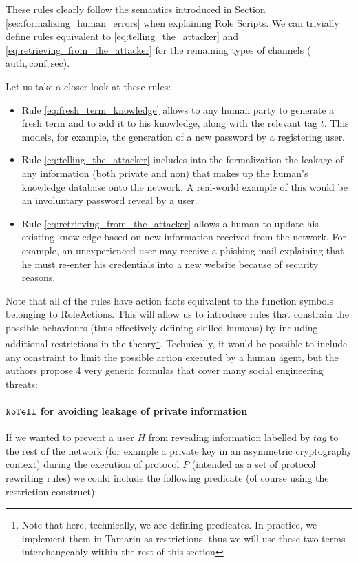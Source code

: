 \documentclass{article}
\newcommand{\mono}[1]{\textrm{\tt #1}}
\begin{document}
These rules clearly follow the semantics introduced in Section \ref{sec:formalizing_human_errors} when explaining Role Scripts. We can trivially define rules equivalent to \ref{eq:telling_the_attacker} and \ref{eq:retrieving_from_the_attacker} for the remaining types of channels ($\textrm{auth}, \textrm{conf}, \textrm{sec}$).

Let us take a closer look at these rules:

\begin{itemize}
    \item Rule \ref{eq:fresh_term_knowledge} allows to any human party to generate a fresh term and to add it to his knowledge, along with the relevant tag $t$. This models, for example, the generation of a new password by a registering user.
    \item Rule \ref{eq:telling_the_attacker} includes into the formalization the leakage of any information (both private and non) that makes up the human's knowledge database onto the network. A real-world example of this would be an involuntary password reveal by a user.
    \item Rule \ref{eq:retrieving_from_the_attacker} allows a human to update his existing knowledge based on new information received from the network. For example, an unexperienced user may receive a phishing mail explaining that he must re-enter his credentials into a new website because of security reasons.
\end{itemize}

Note that all of the rules have action facts equivalent to the function symbols belonging to $\textrm{RoleActions}$. This will allow us to introduce rules that constrain the possible behaviours (thus effectively defining skilled humans) by including additional restrictions in the theory\footnote{Note that here, technically, we are defining predicates. In practice, we implement them in Tamarin as restrictions, thus we will use these two terms interchangeably within the rest of this section}. Technically, it would be possible to include any constraint to limit the possible action executed by a human agent, but the authors propose 4 very generic formulas that cover many social engineering threats:

\paragraph{$\mono{NoTell}$ for avoiding leakage of private information}

If we wanted to prevent a user $H$ from revealing information labelled by $tag$ to the rest of the network (for example a private key in an asymmetric cryptography context) during the execution of protocol $P$ (intended as a set of protocol rewriting rules) we could include the following predicate (of course using the restriction construct):
\end{document}
